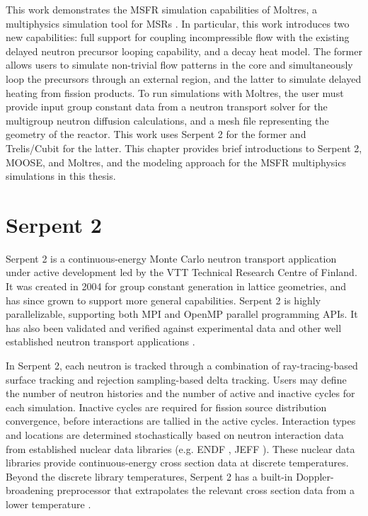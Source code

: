 This work demonstrates the \gls{MSFR} simulation capabilities of Moltres, a
multiphysics simulation tool for \glspl{MSR} \cite{lindsay_introduction_2018}.
In particular, this work introduces two new capabilities: full support
for coupling incompressible flow with the existing delayed neutron precursor
looping capability, and a decay heat model. The former allows users to
simulate non-trivial flow patterns in the core and simultaneously loop the
precursors through an external region, and the latter to simulate delayed
heating from fission products.
To run simulations with Moltres, the user must provide input
group constant data from a neutron transport solver for the
multigroup neutron diffusion calculations, and a mesh file representing the
geometry of the reactor. This work uses Serpent 2 \cite{leppanen_serpent_2014}
for the former and Trelis/Cubit \cite{noauthor_trelis_2018} for the latter.
This chapter provides brief introductions to
Serpent 2, \gls{MOOSE}, and Moltres, and the modeling approach for the
\gls{MSFR} multiphysics simulations in this thesis.

\section{Serpent 2}

Serpent 2 \cite{leppanen_serpent_2014} is a continuous-energy Monte Carlo
neutron transport application under
active development led by the VTT Technical Research Centre of Finland. It was
created in 2004 for group constant generation in lattice geometries, and has
since grown to support more general capabilities. Serpent 2 is highly
parallelizable, supporting both MPI and OpenMP parallel programming APIs. It
has also been validated and verified against experimental data and other well
established neutron transport applications \cite{leppanen_calculation_2014}.

In Serpent 2, each neutron is tracked through a combination of
ray-tracing-based surface tracking and rejection sampling-based delta
tracking. Users may define the number of neutron histories and the number of
active and inactive cycles for each
simulation. Inactive cycles are required for fission source distribution
convergence, before interactions are tallied in the active cycles.
Interaction types and locations are
determined stochastically based on neutron interaction data from established
nuclear data libraries (e.g. ENDF \cite{chadwick_endf/b-vii.1_2011}, JEFF
\cite{oecd/nea_jeff-3.1.2_2014}). These nuclear data libraries provide
continuous-energy cross section data at discrete temperatures. Beyond the
discrete library temperatures, Serpent 2 has a built-in Doppler-broadening
preprocessor that extrapolates the relevant cross section data from a lower
temperature \cite{leppanen_serpent_2014}.

